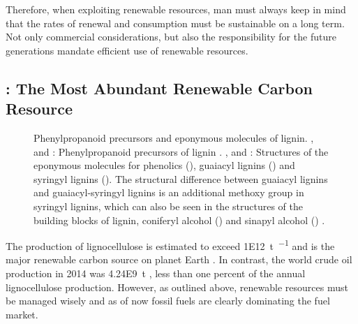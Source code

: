 Therefore, when exploiting renewable resources, man must always keep in mind that the rates of renewal and consumption must be sustainable on a long term. Not only commercial considerations, but also the responsibility for the future generations mandate efficient use of renewable resources.

\subsection{\LCBM{}: The Most Abundant Renewable Carbon Resource\label{subsec-intro-renewable-lcbm}}
\begin{figure}
	\hfill
	\hfill

	\hfill
	\hfill
	\caption[Phenylpropanoid Precursors and Eponymous Molecules of Lignin]{Phenylpropanoid precursors and eponymous molecules of lignin. ,  and : Phenylpropanoid precursors of lignin \cite{Adler1977}. ,  and : Structures of the eponymous molecules for phenolics (), guaiacyl lignins () and syringyl lignins (). The structural difference between guaiacyl lignins and guaiacyl-syringyl lignins is an additional methoxy group in syringyl lignins, which can also be seen in the structures of the building blocks of lignin, coniferyl alcohol () and sinapyl alcohol () \cite{Saka2001}.\label{fig-intro-renewable-lcbm-lignin-precursors}}
\end{figure}

The production of lignocellulose is estimated to exceed \SI{1E12}{\tonne\per\year} and is the major renewable carbon source on planet Earth \cite{Hon1992, Mohanty2000}. In contrast, the world crude oil production in 2014 was \SI{4.24E9}{\tonne} \cite{DERA2015}, less than one percent of the annual lignocellulose production. However, as outlined above, renewable resources must be managed wisely and as of now fossil fuels are clearly dominating the fuel market.

